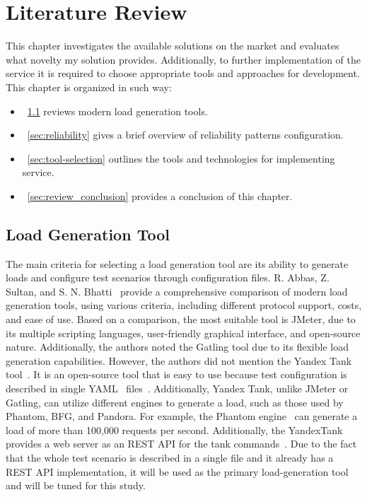 \chapter{Literature Review}
\label{ch:lr}

This chapter investigates the available solutions on the market and evaluates what novelty my solution provides.
Additionally, to further implementation of the service it is required to choose appropriate tools and approaches for development.
This chapter is organized in such way:

\begin{itemize}
    \item~\ref{sec:load_generation} reviews modern load generation tools.
    \item~\ref{sec:reliability} gives a brief overview of reliability patterns configuration.
    \item~\ref{sec:tool-selection} outlines the tools and technologies for implementing service.
    \item~\ref{sec:review_conclusion} provides a conclusion of this chapter.
\end{itemize}

\section{Load Generation Tool}\label{sec:load_generation}
The main criteria for selecting a load generation tool are its ability to generate loads and configure test scenarios through configuration files.
R. Abbas, Z. Sultan, and S. N. Bhatti~\cite{load_testing_tools} provide a comprehensive comparison of modern load generation tools, using various criteria, including different protocol support, costs, and ease of use.
Based on a comparison, the most suitable tool is JMeter, due to its multiple scripting languages, user-friendly graphical interface, and open-source nature. Additionally, the authors noted the Gatling tool due to its flexible load generation capabilities. However, the authors did not mention the Yandex Tank tool~\cite{yandex_tank}. It is an open-source tool that is easy to use because test configuration is described in single YAML~\cite{yaml} files~\cite{load_testing_tools_rus}. Additionally, Yandex Tank, unlike JMeter or Gatling, can utilize different engines to generate a load, such as those used by Phantom, BFG, and Pandora. For example, the Phantom engine~\cite{phantom} can generate a load of more than 100,000 requests per second.
Additionally, the YandexTank provides a web server as an REST API for the tank commands~\cite{yandex_tank_api}.
Due to the fact that the whole test scenario is described in a single file and it already has a REST API implementation, it will be used as the primary load-generation tool and will be tuned for this study.

